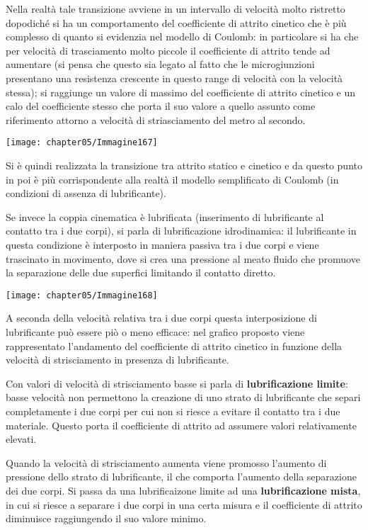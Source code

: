 \begin{enumerate}
Nella realtà tale transizione avviene in un intervallo di velocità molto ristretto dopodiché si ha un comportamento del coefficiente di attrito cinetico che è più complesso di quanto si evidenzia nel modello di Coulomb: in particolare si ha che per velocità di trasciamento molto piccole il coefficiente di attrito tende ad aumentare (si pensa che questo sia legato al fatto che le microgiunzioni presentano una resistenza crescente in questo range di velocità con la velocità stessa); si raggiunge un valore di massimo del coefficiente di attrito cinetico e un calo del coefficiente stesso che porta il suo valore a quello assunto come riferimento attorno a velocità di striasciamento del metro al secondo.

\begin{center}
\texttt{[image: chapter05/Immagine167]}
\end{center}

Si è quindi realizzata la transizione tra attrito statico e cinetico e da questo punto in poi è più corrispondente alla realtà il modello semplificato di Coulomb (in condizioni di assenza di lubrificante).

Se invece la coppia cinematica è lubrificata (inserimento di lubrificante al contatto tra i due corpi), si parla di lubrificazione idrodinamica: il lubrificante in questa condizione è interposto in maniera passiva tra i due corpi e viene trascinato in movimento, dove si crea una pressione al meato fluido che promuove la separazione delle due superfici limitando il contatto diretto.

\begin{center}
\texttt{[image: chapter05/Immagine168]}
\end{center}

A seconda della velocità relativa tra i due corpi questa interposizione di lubrificante può essere piò o meno efficace: nel grafico proposto viene rappresentato l'andamento del coefficiente di attrito cinetico in funzione della velocità di strisciamento in presenza di lubrificante.

Con valori di velocità di strisciamento basse si parla di \textbf{lubrificazione limite}: basse velocità non permettono la creazione di uno strato di lubrificante che separi completamente i due corpi per cui non si riesce a evitare il contatto tra i due materiale. Questo porta il coefficiente di attrito ad assumere valori relativamente elevati.

Quando la velocità di strisciamento aumenta viene promosso l'aumento di pressione dello strato di lubrificante, il che comporta l'aumento della separazione dei due corpi. Si passa da una lubrificaizone limite ad una \textbf{lubrificazione mista}, in cui si riesce a separare i due corpi in una certa misura e il coefficiente di attrito diminuisce raggiungendo il suo valore minimo.


\end{enumerate}
